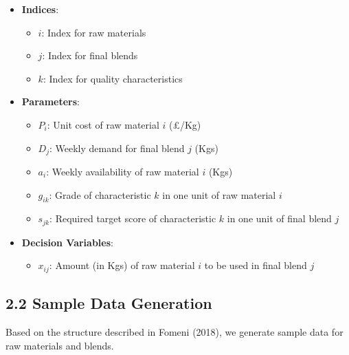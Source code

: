 \documentclass[
]{article}
\providecommand{\tightlist}{%
  \setlength{\itemsep}{0pt}\setlength{\parskip}{0pt}}
\begin{document}
\begin{itemize}
\tightlist
\item
  \textbf{Indices}:

  \begin{itemize}
  \tightlist
  \item
    \(i\): Index for raw materials
  \item
    \(j\): Index for final blends
  \item
    \(k\): Index for quality characteristics
  \end{itemize}
\item
  \textbf{Parameters}:

  \begin{itemize}
  \tightlist
  \item
    \(P_i\): Unit cost of raw material \(i\) (£/Kg)
  \item
    \(D_j\): Weekly demand for final blend \(j\) (Kgs)
  \item
    \(a_i\): Weekly availability of raw material \(i\) (Kgs)
  \item
    \(g_{ik}\): Grade of characteristic \(k\) in one unit of raw
    material \(i\)
  \item
    \(s_{jk}\): Required target score of characteristic \(k\) in one
    unit of final blend \(j\)
  \end{itemize}
\item
  \textbf{Decision Variables}:

  \begin{itemize}
  \tightlist
  \item
    \(x_{ij}\): Amount (in Kgs) of raw material \(i\) to be used in
    final blend \(j\)
  \end{itemize}
\end{itemize}

\subsection{2.2 Sample Data Generation}\label{sample-data-generation}

Based on the structure described in Fomeni (2018), we generate sample
data for raw materials and blends.
\end{document}
